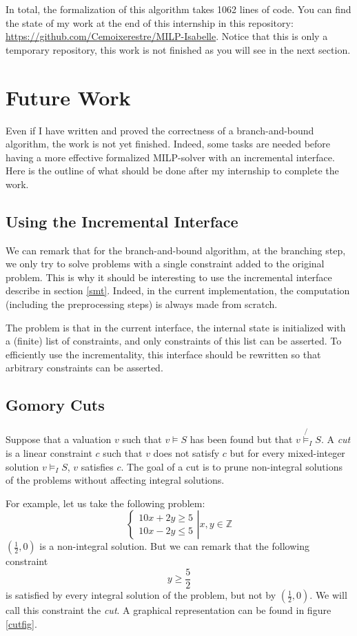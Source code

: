 \documentclass{article}
\newcommand{\ints}{\mathbb{Z}}
\begin{document}
In total, the formalization of this algorithm takes 1062 lines of code. You can
find the state of my work at the end of this internship in this repository:
\url{https://github.com/Cemoixerestre/MILP-Isabelle}. Notice that this is only
a temporary repository, this work is not finished as you will see in the
next section.

\section{Future Work}
Even if I have written and proved the correctness of a branch-and-bound
algorithm, the work is not yet finished. Indeed, some tasks are needed before
having a more effective formalized MILP-solver with an incremental interface.
Here is the outline of what should be done after my internship to complete the
work.

\subsection{Using the Incremental Interface}
We can remark that for the branch-and-bound algorithm, at the branching step, we
only try to solve problems with a single constraint added to the original
problem. This is why it should be interesting to use the incremental interface
describe in section \ref{smt}. Indeed, in the current implementation, the
computation (including the preprocessing steps) is always made from scratch.

The problem is that in the current interface, the internal state is initialized
with a (finite) list of constraints, and only constraints of this list can be
asserted. To efficiently use the incrementality, this interface should be
rewritten so that arbitrary constraints can be asserted.

\subsection{Gomory Cuts}

Suppose that a valuation $v$ such that $v \vDash S$ has been found but that
$v \not{\vDash_I} S$. A \textit{cut} is a
linear constraint $c$ such that $v$ does not satisfy $c$ but for every
mixed-integer solution $v \vDash_I S$, $v$ satisfies $c$. The goal of a cut is
to prune non-integral solutions of the problems without affecting integral
solutions.

For example, let us take the following problem:
\begin{equation}
  \label{cuteq}
  \left\{
  \begin{array}{c}
    10x + 2y \geqslant 5 \\
    10x - 2y \leqslant 5
  \end{array}
  \right|
  x, y \in \ints
\end{equation}
$(\frac{1}{2}, 0)$ is a non-integral solution. But we can remark that the
following constraint $$y \geqslant \frac{5}{2}$$ is satisfied by every integral
solution of the problem, but not by $(\frac{1}{2}, 0)$. We will call this
constraint the \textit{cut}. A graphical representation can be found in figure
\ref{cutfig}.
\end{document}
